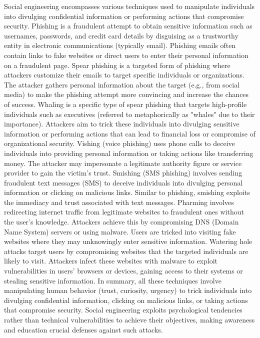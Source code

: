 \documentclass{article}
\begin{document}
\begin{itemize}
	Social engineering encompasses various techniques used to manipulate individuals into divulging confidential information or performing actions that compromise security. Phishing is a fraudulent attempt to obtain sensitive information such as usernames, passwords, and credit card details by disguising as a trustworthy entity in electronic communications (typically email). Phishing emails often contain links to fake websites or direct users to enter their personal information on a fraudulent page. Spear phishing is a targeted form of phishing where attackers customize their emails to target specific individuals or organizations. The attacker gathers personal information about the target (e.g., from social media) to make the phishing attempt more convincing and increase the chances of success. Whaling is a specific type of spear phishing that targets high-profile individuals such as executives (referred to metaphorically as "whales" due to their importance). Attackers aim to trick these individuals into divulging sensitive information or performing actions that can lead to financial loss or compromise of organizational security. Vishing (voice phishing) uses phone calls to deceive individuals into providing personal information or taking actions like transferring money. The attacker may impersonate a legitimate authority figure or service provider to gain the victim's trust. Smishing (SMS phishing) involves sending fraudulent text messages (SMS) to deceive individuals into divulging personal information or clicking on malicious links. Similar to phishing, smishing exploits the immediacy and trust associated with text messages. Pharming involves redirecting internet traffic from legitimate websites to fraudulent ones without the user's knowledge. Attackers achieve this by compromising DNS (Domain Name System) servers or using malware. Users are tricked into visiting fake websites where they may unknowingly enter sensitive information. Watering hole attacks target users by compromising websites that the targeted individuals are likely to visit. Attackers infect these websites with malware to exploit vulnerabilities in users' browsers or devices, gaining access to their systems or stealing sensitive information. In summary, all these techniques involve manipulating human behavior (trust, curiosity, urgency) to trick individuals into divulging confidential information, clicking on malicious links, or taking actions that compromise security. Social engineering exploits psychological tendencies rather than technical vulnerabilities to achieve their objectives, making awareness and education crucial defenses against such attacks.

\end{itemize}
\end{document}
